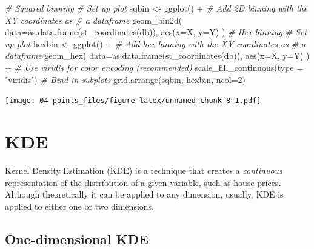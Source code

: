 \documentclass[
]{book}
\newenvironment{Shaded}{\begin{snugshade}}{\end{snugshade}}
\newcommand{\AttributeTok}[1]{\textcolor[rgb]{0.77,0.63,0.00}{#1}}
\newcommand{\CommentTok}[1]{\textcolor[rgb]{0.56,0.35,0.01}{\textit{#1}}}
\newcommand{\DecValTok}[1]{\textcolor[rgb]{0.00,0.00,0.81}{#1}}
\newcommand{\FunctionTok}[1]{\textcolor[rgb]{0.00,0.00,0.00}{#1}}
\newcommand{\NormalTok}[1]{#1}
\newcommand{\OtherTok}[1]{\textcolor[rgb]{0.56,0.35,0.01}{#1}}
\newcommand{\SpecialCharTok}[1]{\textcolor[rgb]{0.00,0.00,0.00}{#1}}
\newcommand{\StringTok}[1]{\textcolor[rgb]{0.31,0.60,0.02}{#1}}
\begin{document}
\begin{Shaded}
\begin{Highlighting}[]
      \CommentTok{\# Squared binning}
\CommentTok{\# Set up plot}
\NormalTok{sqbin }\OtherTok{\textless{}{-}} \FunctionTok{ggplot}\NormalTok{() }\SpecialCharTok{+} 
\CommentTok{\# Add 2D binning with the XY coordinates as}
\CommentTok{\# a dataframe}
  \FunctionTok{geom\_bin2d}\NormalTok{(}
    \AttributeTok{data=}\FunctionTok{as.data.frame}\NormalTok{(}\FunctionTok{st\_coordinates}\NormalTok{(db)), }
    \FunctionTok{aes}\NormalTok{(}\AttributeTok{x=}\NormalTok{X, }\AttributeTok{y=}\NormalTok{Y)}
\NormalTok{  )}
      \CommentTok{\# Hex binning}
\CommentTok{\# Set up plot}
\NormalTok{hexbin }\OtherTok{\textless{}{-}} \FunctionTok{ggplot}\NormalTok{() }\SpecialCharTok{+}
\CommentTok{\# Add hex binning with the XY coordinates as}
\CommentTok{\# a dataframe }
  \FunctionTok{geom\_hex}\NormalTok{(}
    \AttributeTok{data=}\FunctionTok{as.data.frame}\NormalTok{(}\FunctionTok{st\_coordinates}\NormalTok{(db)),}
    \FunctionTok{aes}\NormalTok{(}\AttributeTok{x=}\NormalTok{X, }\AttributeTok{y=}\NormalTok{Y)}
\NormalTok{  ) }\SpecialCharTok{+}
\CommentTok{\# Use viridis for color encoding (recommended)}
  \FunctionTok{scale\_fill\_continuous}\NormalTok{(}\AttributeTok{type =} \StringTok{"viridis"}\NormalTok{)}
      \CommentTok{\# Bind in subplots}
\FunctionTok{grid.arrange}\NormalTok{(sqbin, hexbin, }\AttributeTok{ncol=}\DecValTok{2}\NormalTok{)}
\end{Highlighting}
\end{Shaded}

\texttt{[image: 04-points\_files/figure-latex/unnamed-chunk-8-1.pdf]}

\hypertarget{kde}{%
\section{KDE}\label{kde}}

Kernel Density Estimation (KDE) is a technique that creates a \emph{continuous} representation of the distribution of a given variable, such as house prices. Although theoretically it can be applied to any dimension, usually, KDE is applied to either one or two dimensions.

\hypertarget{one-dimensional-kde}{%
\subsection{One-dimensional KDE}\label{one-dimensional-kde}}
\end{document}
